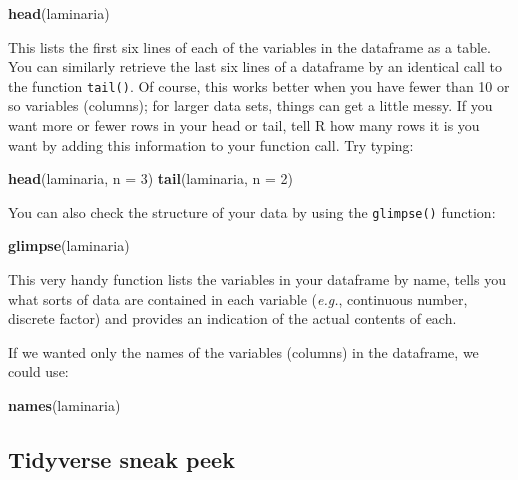 \documentclass[
]{book}
\newenvironment{Shaded}{\begin{snugshade}}{\end{snugshade}}
\newcommand{\DataTypeTok}[1]{\textcolor[rgb]{0.13,0.29,0.53}{#1}}
\newcommand{\DecValTok}[1]{\textcolor[rgb]{0.00,0.00,0.81}{#1}}
\newcommand{\KeywordTok}[1]{\textcolor[rgb]{0.13,0.29,0.53}{\textbf{#1}}}
\newcommand{\NormalTok}[1]{#1}
\begin{document}
\begin{Shaded}
\begin{Highlighting}[]
\KeywordTok{head}\NormalTok{(laminaria)}
\end{Highlighting}
\end{Shaded}

This lists the first six lines of each of the variables in the dataframe as a table. You can similarly retrieve the last six lines of a dataframe by an identical call to the function \texttt{tail()}. Of course, this works better when you have fewer than 10 or so variables (columns); for larger data sets, things can get a little messy. If you want more or fewer rows in your head or tail, tell R how many rows it is you want by adding this information to your function call. Try typing:

\begin{Shaded}
\begin{Highlighting}[]
\KeywordTok{head}\NormalTok{(laminaria, }\DataTypeTok{n =} \DecValTok{3}\NormalTok{)}
\KeywordTok{tail}\NormalTok{(laminaria, }\DataTypeTok{n =} \DecValTok{2}\NormalTok{)}
\end{Highlighting}
\end{Shaded}

You can also check the structure of your data by using the \texttt{glimpse()} function:

\begin{Shaded}
\begin{Highlighting}[]
\KeywordTok{glimpse}\NormalTok{(laminaria)}
\end{Highlighting}
\end{Shaded}

This very handy function lists the variables in your dataframe by name, tells you what sorts of data are contained in each variable (\emph{e.g.}, continuous number, discrete factor) and provides an indication of the actual contents of each.

If we wanted only the names of the variables (columns) in the dataframe, we could use:

\begin{Shaded}
\begin{Highlighting}[]
\KeywordTok{names}\NormalTok{(laminaria)}
\end{Highlighting}
\end{Shaded}

\hypertarget{tidyverse-sneak-peek}{%
\subsection{Tidyverse sneak peek}\label{tidyverse-sneak-peek}}
\end{document}
